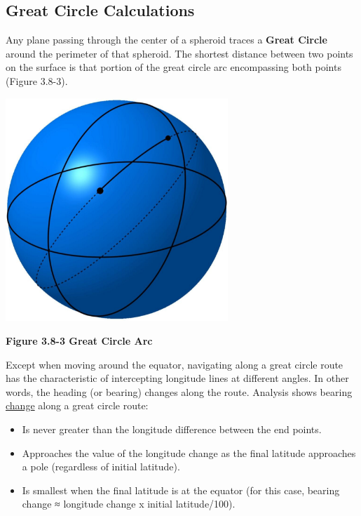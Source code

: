 \documentclass[
]{book}
\providecommand{\tightlist}{%
  \setlength{\itemsep}{0pt}\setlength{\parskip}{0pt}}
\begin{document}
\hypertarget{great-circle-calculations}{%
\subsection*{Great Circle Calculations}\label{great-circle-calculations}}

Any plane passing through the center of a spheroid traces a \textbf{Great Circle} around the perimeter of that spheroid. The shortest distance between two points on the surface is that portion of the great circle arc encompassing both points (Figure 3.8-3).

\includegraphics[width=3.30506in,height=3.31132in]{media/03/image32.svg}

\textbf{Figure 3.8-3 Great Circle Arc}

Except when moving around the equator, navigating along a great circle route has the characteristic of intercepting longitude lines at different angles. In other words, the heading (or bearing) changes along the route. Analysis shows bearing \underline{change} along a great circle route:

\begin{itemize}
\tightlist
\item
  Is never greater than the longitude difference between the end points.
\item
  Approaches the value of the longitude change as the final latitude approaches a pole (regardless of initial latitude).
\item
  Is smallest when the final latitude is at the equator (for this case, bearing change ≈ longitude change x initial latitude/100).
\end{itemize}
\end{document}
